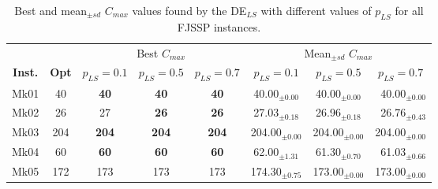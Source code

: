\begin{table}[!tb]
  \centering
     \scriptsize
    \label{tab:DELS}
    \caption{Best and mean$_{\pm sd}$ $C_{max}$ values found by the DE$_{LS}$ with different values of $p_{LS}$ for all FJSSP instances.}
    \begin{tabular}{|rrcccrrr|}
    \hline
    \multicolumn{1}{|c}{} & \multicolumn{1}{|c|}{} & \multicolumn{3}{c|}{Best $C_{max}$} & \multicolumn{3}{c|}{Mean$_{\pm sd}$ $C_{max}$} \bigstrut \\
    \cline{3-8}
    \multicolumn{1}{|c|}{\textbf{Inst.}} & \multicolumn{1}{c|}{\textbf{Opt}} & \multicolumn{1}{c|}{\textbf{$p_{LS}=0.1$}} & \multicolumn{1}{c|}{\textbf{$p_{LS}=0.5$}} & \multicolumn{1}{c|}{\textbf{$p_{LS}=0.7$}} & \multicolumn{1}{c|}{\textbf{$p_{LS}=0.1$}} & \multicolumn{1}{c|}{\textbf{$p_{LS}=0.5$}} & \multicolumn{1}{c|}{\textbf{$p_{LS}=0.7$}} \bigstrut\\
    \hline
    \multicolumn{1}{|c|}{Mk01} & \multicolumn{1}{c|}{40} & \multicolumn{1}{c|}{\textbf{40}} & \multicolumn{1}{c|}{\textbf{40}} & \multicolumn{1}{c|}{\textbf{40}} & \multicolumn{1}{c|}{40.00$_{\pm 0.00}$} & \multicolumn{1}{c|}{40.00$_{\pm 0.00}$} & 40.00$_{\pm 0.00}$ \bigstrut\\
    \multicolumn{1}{|c|}{Mk02} & \multicolumn{1}{c|}{26} & \multicolumn{1}{c|}{27} & \multicolumn{1}{c|}{\textbf{26}} & \multicolumn{1}{c|}{\textbf{26}} & \multicolumn{1}{c|}{27.03$_{\pm 0.18}$} & \multicolumn{1}{c|}{26.96$_{\pm 0.18}$} & 26.76$_{\pm 0.43}$ \bigstrut\\
    \multicolumn{1}{|c|}{Mk03} & \multicolumn{1}{c|}{204} & \multicolumn{1}{c|}{\textbf{204}} & \multicolumn{1}{c|}{\textbf{204}} & \multicolumn{1}{c|}{\textbf{204}} & \multicolumn{1}{c|}{204.00$_{\pm 0.00}$} & \multicolumn{1}{c|}{204.00$_{\pm 0.00}$} & 204.00$_{\pm 0.00}$ \bigstrut\\
    \multicolumn{1}{|c|}{Mk04} & \multicolumn{1}{c|}{60} & \multicolumn{1}{c|}{\textbf{60}} & \multicolumn{1}{c|}{\textbf{60}} & \multicolumn{1}{c|}{\textbf{60}} & \multicolumn{1}{c|}{62.00$_{\pm 1.31}$} & \multicolumn{1}{c|}{61.30$_{\pm 0.70}$} & 61.03$_{\pm 0.66}$ \bigstrut\\
    \multicolumn{1}{|c|}{Mk05} & \multicolumn{1}{c|}{172} & \multicolumn{1}{c|}{173} & \multicolumn{1}{c|}{173} & \multicolumn{1}{c|}{173} & \multicolumn{1}{c|}{174.30$_{\pm 0.75}$} & \multicolumn{1}{c|}{173.00$_{\pm 0.00}$ }& 173.00$_{\pm 0.00}$ \bigstrut\\

\end{tabular}
\end{table}
